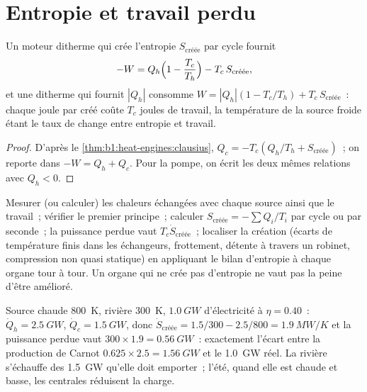 \section{Entropie et travail perdu}

\begin{theorem}\label{thm:b1:heat-engines:lostwork}
Un moteur ditherme qui crée l'entropie $S_{\text{créée}}$ par cycle
fournit
\[
-W = Q_h\Bigl(1 - \frac{T_c}{T_h}\Bigr) - T_c\,S_{\text{créée}} ,
\]
et une  ditherme qui fournit $|Q_h|$ consomme
$W = |Q_h|(1 - T_c/T_h) + T_c\,S_{\text{créée}}$~: chaque joule par 
créé coûte $T_c$ joules de travail, la température de la source froide étant
le taux de change entre entropie et travail.
\end{theorem}

\begin{proof}
D'après le \cref{thm:b1:heat-engines:clausius}, $Q_c = -T_c(Q_h/T_h + S_{\text{créée}})$~;
on reporte dans $-W = Q_h + Q_c$. Pour la pompe, on écrit les deux mêmes
relations avec $Q_h < 0$.
\end{proof}

\begin{method}\label{meth:b1:heat-engines:audit}
Mesurer (ou calculer) les chaleurs échangées avec chaque source ainsi que le
travail~; vérifier le premier principe~; calculer $S_{\text{créée}} = -\sum Q_i/T_i$ par cycle
ou par seconde~; la puissance perdue vaut $T_c\dot S_{\text{créée}}$~; localiser
la création (écarts de température finis dans les échangeurs, frottement,
détente à travers un robinet, compression non quasi statique) en appliquant
le bilan d'entropie à chaque organe tour à tour. Un organe qui ne crée pas
d'entropie ne vaut pas la peine d'être amélioré.
\end{method}

\begin{example}\label{ex:b1:heat-engines:audit}
Source chaude \qty{800}{K}, rivière \qty{300}{K}, $\qty{1.0}{GW}$ d'électricité
à $\eta = 0.40$~: $\dot Q_h = \qty{2.5}{GW}$, $\dot Q_c = \qty{1.5}{GW}$, donc
$\dot S_{\text{créée}} = 1.5/300 - 2.5/800 = \qty{1.9}{MW/K}$ et la puissance
perdue vaut $300 \times 1.9 = \qty{0.56}{GW}$~: exactement l'écart entre la
production de Carnot $0.625 \times 2.5 = \qty{1.56}{GW}$ et le \qty{1.0}{GW} réel.
La rivière s'échauffe des \qty{1.5}{GW} qu'elle doit emporter~; l'été, quand
elle est chaude et basse, les centrales réduisent la charge.
\end{example}

